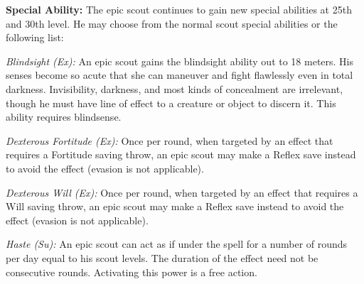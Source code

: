 \textbf{Special Ability:} The epic scout continues to gain new special abilities at 25th and 30th level. He may choose from the normal scout special abilities or the following list:

\textit{Blindsight (Ex):} An epic scout gains the blindsight ability out to 18 meters. His senses become so acute that she can maneuver and fight flawlessly even in total darkness. Invisibility, darkness, and most kinds of concealment are irrelevant, though he must have line of effect to a creature or object to discern it. This ability requires blindsense.

\textit{Dexterous Fortitude (Ex):} Once per round, when targeted by an effect that requires a Fortitude saving throw, an epic scout may make a Reflex save instead to avoid the effect (evasion is not applicable).

\textit{Dexterous Will (Ex):} Once per round, when targeted by an effect that requires a Will saving throw, an epic scout may make a Reflex save instead to avoid the effect (evasion is not applicable).

\textit{Haste (Su):} An epic scout can act as if under the  spell for a number of rounds per day equal to \onefifth his scout levels. The duration of the effect need not be consecutive rounds. Activating this power is a free action.
